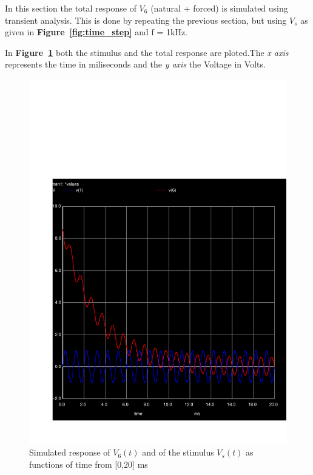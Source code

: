 In this section the total response of $V_6$ (natural + forced) is simulated using transient analysis. This is done by repeating the previous section, but using {\it $V_s$} as given in \textbf{Figure~\ref{fig:time_step}} and f = 1kHz.\par
In \textbf{Figure~\ref{fig:resp_total}} both the stimulus and the total response are ploted.The \textit{x axis} represents the time in miliseconds and the \textit{y axis} the Voltage in Volts. 
\begin{figure}[h] \centering
\includegraphics[width=0.6\linewidth]{transv5vs.pdf}
\caption{Simulated response of $V_{6}(t)$ and of the stimulus $V_{s}(t)$ as functions of time from [0,20] ms}
\label{fig:resp_total}
\end{figure}

\pagebreak
